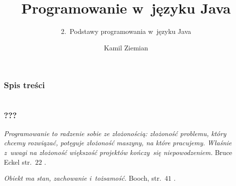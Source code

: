 \documentclass[10pt,t]{beamer}
\title{Programowanie w~języku Java}
\subtitle{2.~Podstawy programowania w~języku Java}
\author{Kamil Ziemian \\
  \email}
\begin{document}





\RaggedRight





\maketitle





\begin{frame}
  \frametitle{Spis treści}


  \tableofcontents

\end{frame}










\section{}


\begin{frame}
  \frametitle{???}


  \textit{Programowanie to radzenie sobie ze złożonością: złożoność
    problemu, który chcemy rozwiązać, potęguje złożoność maszyny, na które
    pracujemy. Właśnie z~uwagi na złożoność większość projektów kończy~się
    niepowodzeniem.} Bruce Eckel
  str.~$22$ \parencite{Eckel-Thinnking-in-Java-Ed-polska-Wyd-III-Pub-2003}.

  \textit{Obiekt ma stan, zachowanie i~tożsamość.} Booch,
  str.~$41$ \parencite{Eckel-Thinnking-in-Java-Ed-polska-Wyd-III-Pub-2003}.


\end{frame}





\end{document}
